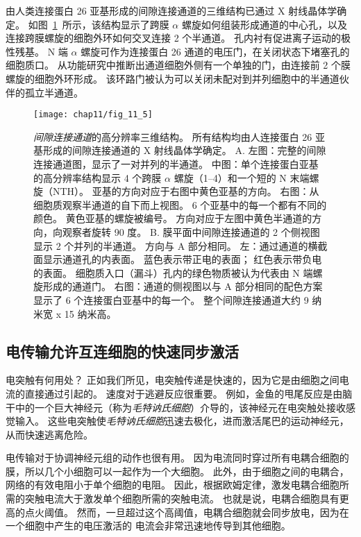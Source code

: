 由人类连接蛋白 26 亚基形成的间隙连接通道的三维结构已通过 X 射线晶体学确定。
如图~\ref{fig:11_5}~所示，该结构显示了跨膜 $\alpha$ 螺旋如何组装形成通道的中心孔，以及连接跨膜螺旋的细胞外环如何交叉连接 2 个半通道。
孔内衬有促进离子运动的极性残基。
N 端 $\alpha$ 螺旋可作为连接蛋白 26 通道的电压门，在关闭状态下堵塞孔的细胞质口。
从功能研究中推断出通道细胞外侧有一个单独的门，由连接前 2 个膜螺旋的细胞外环形成。
该环路门被认为可以关闭未配对到并列细胞中的半通道伙伴的孤立半通道。


\begin{figure}[htbp]
	\centering
	\texttt{[image: chap11/fig\_11\_5]}
	\caption{\textit{间隙连接通道}的高分辨率三维结构。
		所有结构均由人连接蛋白 26 亚基形成的间隙连接通道的 X 射线晶体学确定。
		A. 左图：完整的间隙连接通道图，显示了一对并列的半通道。
		中图：单个连接蛋白亚基的高分辨率结构显示 4 个跨膜 $\alpha$ 螺旋（1–4）和一个短的 N 末端螺旋（NTH）。
		亚基的方向对应于右图中黄色亚基的方向。
		右图：从细胞质观察半通道的自下而上视图。
		6 个亚基中的每一个都有不同的颜色。
		黄色亚基的螺旋被编号。
		方向对应于左图中黄色半通道的方向，向观察者旋转 90 度。
		B. 膜平面中间隙连接通道的 2 个侧视图显示 2 个并列的半通道。
		方向与 A 部分相同。
		左：通过通道的横截面显示通道孔的内表面。
		蓝色表示带正电的表面；
		红色表示带负电的表面。
		细胞质入口（漏斗）孔内的绿色物质被认为代表由 N 端螺旋形成的通道门。
		右图：通道的侧视图以与 A 部分相同的配色方案显示了 6 个连接蛋白亚基中的每一个。
		整个间隙连接通道大约 9 纳米宽 x 15 纳米高。}
	\label{fig:11_5}
\end{figure}


\subsection{电传输允许互连细胞的快速同步激活}

电突触有何用处？
正如我们所见，电突触传递是快速的，因为它是由细胞之间电流的直接通过引起的。
速度对于逃避反应很重要。
例如，金鱼的甩尾反应是由脑干中的一个巨大神经元（称为\textit{毛特讷氏细胞}）介导的，该神经元在电突触处接收感觉输入。
这些电突触使\textit{毛特讷氏细胞}迅速去极化，进而激活尾巴的运动神经元，从而快速逃离危险。


电传输对于协调神经元组的动作也很有用。
因为电流同时穿过所有电耦合细胞的膜，所以几个小细胞可以一起作为一个大细胞。
此外，由于细胞之间的电耦合，网络的有效电阻小于单个细胞的电阻。
因此，根据欧姆定律，激发电耦合细胞所需的突触电流大于激发单个细胞所需的突触电流。
也就是说，电耦合细胞具有更高的点火阈值。
然而，一旦超过这个高阈值，电耦合细胞就会同步放电，因为在一个细胞中产生的电压激活的  电流会非常迅速地传导到其他细胞。


